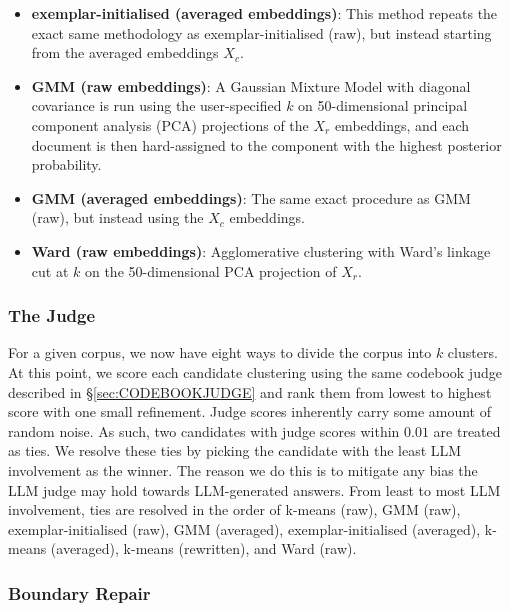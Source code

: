 \documentclass[11pt,a4paper,oneside]{report}
\begin{document}
\begin{itemize}
\item\textbf{exemplar-initialised (averaged embeddings)}: This method repeats the exact same methodology as exemplar-initialised (raw), but instead starting from the averaged embeddings $X_c$.
\item \textbf{GMM (raw embeddings)}: A Gaussian Mixture Model with diagonal covariance is run using the user-specified $k$ on 50-dimensional principal component analysis (PCA) projections of the $X_r$ embeddings, and each document is then hard-assigned to the component with the highest posterior probability.
\item \textbf{GMM (averaged embeddings)}: The same exact procedure as GMM (raw), but instead using the $X_c$ embeddings.
\item \textbf{Ward (raw embeddings)}: Agglomerative clustering with Ward's linkage cut at $k$ on the 50-dimensional PCA projection of $X_r$.
\end{itemize}

\subsubsection{The Judge}

For a given corpus, we now have eight ways to divide the corpus into $k$ clusters. At this point, we score each candidate clustering using the same codebook judge described in \S\ref{sec:CODEBOOKJUDGE} and rank them from lowest to highest score with one small refinement. Judge scores inherently carry some amount of random noise. As such, two candidates with judge scores within $0.01$ are treated as ties. We resolve these ties by picking the candidate with the least LLM involvement as the winner. The reason we do this is to mitigate any bias the LLM judge may hold towards LLM-generated answers. From least to most LLM involvement, ties are resolved in the order of k-means (raw), GMM (raw), exemplar-initialised (raw), GMM (averaged), exemplar-initialised (averaged), k-means (averaged), k-means (rewritten), and Ward (raw).

\subsubsection{Boundary Repair}
\end{document}
